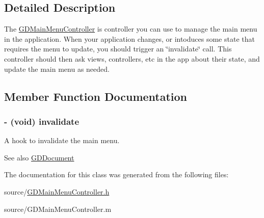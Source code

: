 \subsection{Detailed Description}
The \hyperlink{interface_g_d_main_menu_controller}{GDMainMenuController} is controller you can use to manage the main menu in the application. When your application changes, or intoduces some state that requires the menu to update, you should trigger an \char`\"{}invalidate\char`\"{} call. This controller should then ask views, controllers, etc in the app about their state, and update the main menu as needed. 

\subsection{Member Function Documentation}
\hypertarget{interface_g_d_main_menu_controller_aa1a7ba88d3c69ffc38b7ee617f9fc551}{
\subsubsection[{invalidate}]{\setlength{\rightskip}{0pt plus 5cm}-\/ (void) invalidate }}
\label{interface_g_d_main_menu_controller_aa1a7ba88d3c69ffc38b7ee617f9fc551}


A hook to invalidate the main menu. \begin{DoxySeeAlso}{See also}
\hyperlink{interface_g_d_document}{GDDocument} 
\end{DoxySeeAlso}


The documentation for this class was generated from the following files:\begin{DoxyCompactItemize}
\item 
source/\hyperlink{_g_d_main_menu_controller_8h}{GDMainMenuController.h}\item 
source/GDMainMenuController.m\end{DoxyCompactItemize}
